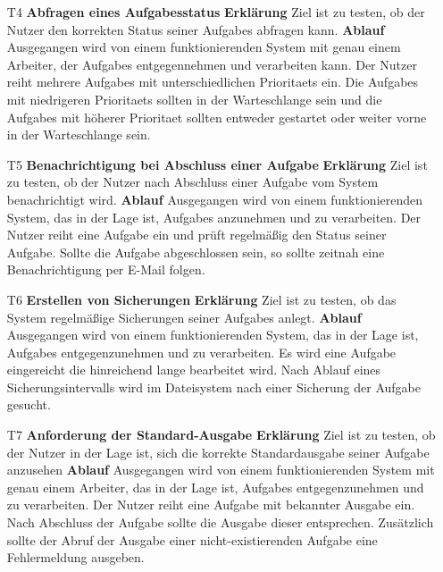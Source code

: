 \documentclass[a4paper,12pt]{article}
\begin{document}
\begin{itemize}
\item[T4] \textbf{Abfragen eines \glspl{Aufgabe}status }
\subitem \textbf{Erklärung} Ziel ist zu testen, ob der Nutzer den korrekten Status seiner \glspl{Aufgabe} abfragen kann.
\subitem \textbf{Ablauf} Ausgegangen wird von einem funktionierenden System mit genau einem Arbeiter, der \glspl{Aufgabe} entgegennehmen und verarbeiten kann.
Der Nutzer reiht mehrere \glspl{Aufgabe} mit unterschiedlichen \glspl{Prioritaet} ein. Die \glspl{Aufgabe} mit niedrigeren \glspl{Prioritaet} sollten in der \gls{Warteschlange} sein und die \glspl{Aufgabe} mit höherer \gls{Prioritaet} sollten entweder gestartet oder weiter vorne in der \gls{Warteschlange} sein.

\item[T5] \textbf{Benachrichtigung bei Abschluss einer \gls{Aufgabe} }
\subitem \textbf{Erklärung} Ziel ist zu testen, ob der Nutzer nach Abschluss einer \gls{Aufgabe} vom System benachrichtigt wird.
\subitem \textbf{Ablauf} Ausgegangen wird von einem funktionierenden System, das in der Lage ist, \glspl{Aufgabe} anzunehmen und zu verarbeiten.
Der Nutzer reiht eine \gls{Aufgabe} ein und prüft regelmäßig den Status seiner \gls{Aufgabe}. Sollte die \gls{Aufgabe} abgeschlossen sein, so sollte zeitnah eine Benachrichtigung per E-Mail folgen.

\item[T6] \textbf{Erstellen von Sicherungen}
\subitem \textbf{Erklärung} Ziel ist zu testen, ob das System regelmäßige Sicherungen seiner \glspl{Aufgabe} anlegt.
\subitem \textbf{Ablauf} Ausgegangen wird von einem funktionierenden System, das in der Lage ist, \glspl{Aufgabe} entgegenzunehmen und zu verarbeiten. Es wird eine \gls{Aufgabe} eingereicht die hinreichend lange bearbeitet wird. Nach Ablauf eines Sicherungsintervalls wird im Dateisystem nach einer Sicherung der \gls{Aufgabe} gesucht.

\item[T7] \textbf{Anforderung der Standard-Ausgabe }
\subitem \textbf{Erklärung} Ziel ist zu testen, ob der Nutzer in der Lage ist, sich die korrekte Standardausgabe seiner \gls{Aufgabe} anzusehen
\subitem \textbf{Ablauf} Ausgegangen wird von einem funktionierenden System mit genau einem Arbeiter, das in der Lage ist, \glspl{Aufgabe} entgegenzunehmen und zu verarbeiten.
Der Nutzer reiht eine \gls{Aufgabe} mit bekannter Ausgabe ein. Nach Abschluss der \gls{Aufgabe} sollte die Ausgabe dieser entsprechen. Zusätzlich sollte der Abruf der Ausgabe einer nicht-existierenden \gls{Aufgabe} eine Fehlermeldung ausgeben.
\end{itemize}
\end{document}
